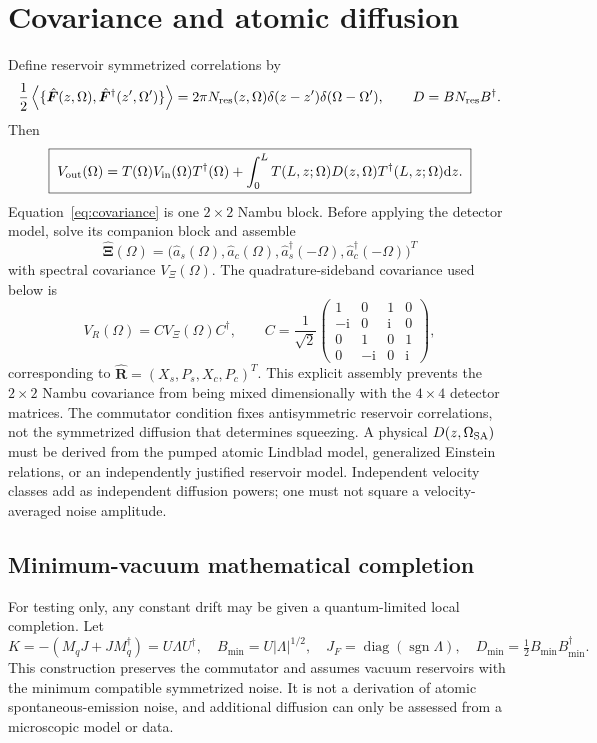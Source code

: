 \documentclass[11pt,a4paper]{article}
\newcommand{\dd}{\mathrm d}
\newcommand{\ii}{\mathrm i}
\begin{document}
\section{Covariance and atomic diffusion}

Define reservoir symmetrized correlations by
\[
\frac12\left\langle
\{\hat{\bm F}(z,\Omega),\hat{\bm F}^\dagger(z',\Omega')\}\right\rangle
=2\pi N_{\rm res}(z,\Omega)\delta(z-z')\delta(\Omega-\Omega'),
\qquad D=BN_{\rm res}B^\dagger .
\]
Then
\begin{equation}
\boxed{\;
V_{\rm out}(\Omega)=
T(\Omega)V_{\rm in}(\Omega)T^\dagger(\Omega)
+\int_0^L T(L,z;\Omega)D(z,\Omega)T^\dagger(L,z;\Omega)\dd z .\;}
\label{eq:covariance}
\end{equation}
Equation~\eqref{eq:covariance} is one $2\times2$ Nambu block. Before applying
the detector model, solve its companion block and assemble
\[
\hat{\bm\Xi}(\Omega)=
\bigl(\hat a_s(\Omega),\hat a_c(\Omega),
\hat a_s^\dagger(-\Omega),\hat a_c^\dagger(-\Omega)\bigr)^T
\]
with spectral covariance $V_\Xi(\Omega)$. The quadrature-sideband covariance
used below is
\begin{equation}
V_R(\Omega)=CV_\Xi(\Omega)C^\dagger,\qquad
C=\frac1{\sqrt2}
\begin{pmatrix}
1&0&1&0\\
-\ii&0&\ii&0\\
0&1&0&1\\
0&-\ii&0&\ii
\end{pmatrix},
\label{eq:nambu-quadrature}
\end{equation}
corresponding to $\hat{\bm R}=(X_s,P_s,X_c,P_c)^T$. This explicit assembly
prevents the $2\times2$ Nambu covariance from being mixed dimensionally with
the $4\times4$ detector matrices.
The commutator condition fixes antisymmetric reservoir correlations, not the
symmetrized diffusion that determines squeezing. A physical
$D(z,\Omega_{\rm SA})$ must be derived from the pumped atomic Lindblad model,
generalized Einstein relations, or an independently justified reservoir
model. Independent velocity classes add as independent diffusion powers;
one must not square a velocity-averaged noise amplitude.

\subsection{Minimum-vacuum mathematical completion}

For testing only, any constant drift may be given a quantum-limited local
completion. Let
\begin{equation}
K=-(M_qJ+JM_q^\dagger)=U\Lambda U^\dagger,\quad
B_{\min}=U|\Lambda|^{1/2},\quad
J_F=\operatorname{diag}(\operatorname{sgn}\Lambda),\quad
D_{\min}=\tfrac12B_{\min}B_{\min}^\dagger .
\label{eq:minimal-dilation}
\end{equation}
This construction preserves the commutator and assumes vacuum reservoirs with
the minimum compatible symmetrized noise. It is not a derivation of atomic
spontaneous-emission noise, and additional diffusion can only be assessed from
a microscopic model or data.
\end{document}
